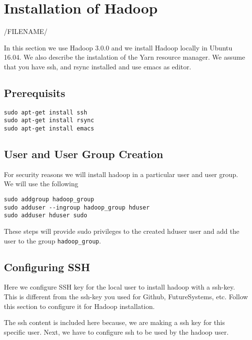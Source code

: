 \section{Installation of Hadoop}\label{s:hadoop-local-installation}

/FILENAME/

In this section we use Hadoop 3.0.0 and we install Hadoop locally in
Ubuntu 16.04. We also describe the instalation of the Yarn
resource manager. We assume that you have ssh, and rsync installed and
use emacs as editor. 

\subsection{Prerequisits}

\begin{lstlisting}
sudo apt-get install ssh
sudo apt-get install rsync
sudo apt-get install emacs
\end{lstlisting}

\subsection{User and User Group Creation}

For security reasons we will install hadoop in a particular user and
user group. We will use the following

\begin{lstlisting}
sudo addgroup hadoop_group
sudo adduser --ingroup hadoop_group hduser
sudo adduser hduser sudo
\end{lstlisting}

These steps will provide sudo privileges to the created hduser
user and add the user to the group \verb|hadoop_group|.

\subsection{Configuring SSH}

\begin{NOTE}
  Here we configure SSH key for the local user to install hadoop with a ssh-key.
  This is different from the ssh-key you used for Github, FutureSystems, etc.
  Follow this section to configure it for Hadoop installation. 
\end{NOTE}

The ssh content is included here because, we are making a
ssh key for this specific user. 
Next, we have to configure ssh to be used by the hadoop user.

